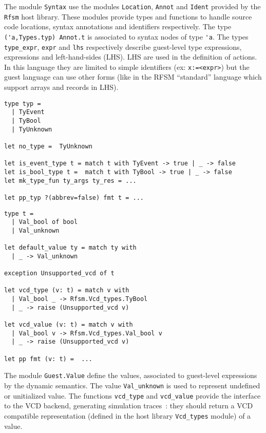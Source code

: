 The module \texttt{Syntax} use the modules \texttt{Location}, \texttt{Annot}  and \texttt{Ident}
provided by the \texttt{Rfsm} host library. These modules provide types and functions to handle
source code locations, syntax annotations and identifiers respectively. The type
\verb|('a,Types.typ) Annot.t| is associated to syntax nodes of type
\verb|'a|. The types \verb|type_expr|, \verb|expr| and \verb|lhs| respectively describe guest-level
type expressions, expressions and left-hand-sides (LHS). LHS are used in the definition of
actions. In this language they are limited to simple identifiers (ex: \verb|x:=<expr>|) but the
guest language can use other forms (like in the RFSM ``standard'' language which support arrays and
records in LHS). 

\begin{lstlisting}[language={[Objective]Caml},frame=single,basicstyle=\small,caption={Module
    \texttt{Guest.Values} (excerpt)},label={lst:mini-value}]
type typ =
  | TyEvent
  | TyBool
  | TyUnknown

let no_type =  TyUnknown

let is_event_type t = match t with TyEvent -> true | _ -> false
let is_bool_type t =  match t with TyBool -> true | _ -> false
let mk_type_fun ty_args ty_res = ...

let pp_typ ?(abbrev=false) fmt t = ...
\end{lstlisting}

\begin{lstlisting}[language={[Objective]Caml},frame=single,basicstyle=\small,caption={Module
    \texttt{Guest.Value} (excerpt)},label={lst:mini-value}]
type t =
  | Val_bool of bool
  | Val_unknown

let default_value ty = match ty with
  | _ -> Val_unknown

exception Unsupported_vcd of t

let vcd_type (v: t) = match v with
  | Val_bool _ -> Rfsm.Vcd_types.TyBool
  | _ -> raise (Unsupported_vcd v)

let vcd_value (v: t) = match v with
  | Val_bool v -> Rfsm.Vcd_types.Val_bool v
  | _ -> raise (Unsupported_vcd v)

let pp fmt (v: t) =  ...
\end{lstlisting}

The module \verb|Guest.Value| define the values, associated to guest-level expressions by the
dynamic semantics. The value \verb|Val_unknown| is used to represent undefined or unitialized
value. The functions \verb|vcd_type| and \verb|vcd_value| provide the interface to the VCD backend,
generating simulation traces~: they should return a VCD compatible representation  (defined in the
host library \verb|Vcd_types| module) of a value.


